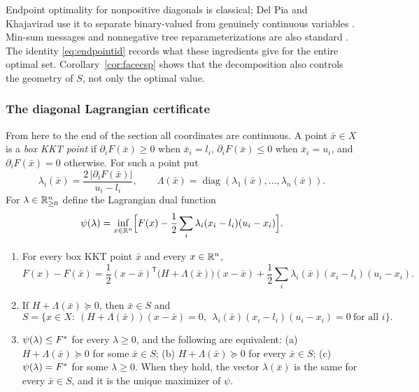 Endpoint optimality for nonpositive diagonals is classical; Del Pia and
Khajavirad use it to separate binary-valued from genuinely continuous
variables \cite{DelPiaKhajavirad2026}. Min-sum messages and nonnegative tree
reparameterizations are also standard \cite{Dechter1999,WainwrightJaakkolaWillsky2005}.
The identity \eqref{eq:endpointid} records what these ingredients give for
the entire optimal set. Corollary~\ref{cor:facecsp} shows that the
decomposition also controls the geometry of $S$, not only the optimal value.

\subsubsection{The diagonal Lagrangian certificate}

From here to the end of the section all coordinates are continuous. A point
$\bar x\in X$ is a \emph{box KKT point} if $\partial_iF(\bar x)\ge0$ when
$\bar x_i=l_i$, $\partial_iF(\bar x)\le0$ when $\bar x_i=u_i$, and
$\partial_iF(\bar x)=0$ otherwise. For such a point put
\[
\lambda_i(\bar x)=\frac{2\,|\partial_iF(\bar x)|}{u_i-l_i},\qquad
\Lambda(\bar x)=\operatorname{diag}(\lambda_1(\bar x),\ldots,\lambda_n(\bar x)).
\]
For $\lambda\in\mathbb R^n_{\ge0}$ define the Lagrangian dual function
\[
\psi(\lambda)=\inf_{x\in\mathbb R^n}\Bigl[F(x)-\frac12\sum_i\lambda_i(x_i-l_i)(u_i-x_i)\Bigr].
\]

\begin{lemma}\label{lem:diagcert}
\begin{enumerate}
\item[(i)] For every box KKT point $\bar x$ and every $x\in\mathbb R^n$,
\begin{equation}\label{eq:diagid}
F(x)-F(\bar x)=\frac12(x-\bar x)^{\mathsf T}\bigl(H+\Lambda(\bar x)\bigr)(x-\bar x)
+\frac12\sum_i\lambda_i(\bar x)(x_i-l_i)(u_i-x_i).
\end{equation}
\item[(ii)] If $H+\Lambda(\bar x)\succeq0$, then $\bar x\in S$ and
\begin{equation}\label{eq:diagset}
S=\bigl\{x\in X:\ (H+\Lambda(\bar x))(x-\bar x)=0,\ \
\lambda_i(\bar x)(x_i-l_i)(u_i-x_i)=0\ \text{for all }i\bigr\}.
\end{equation}
\item[(iii)] $\psi(\lambda)\le F^*$ for every $\lambda\ge0$, and the
following are equivalent: (a) $H+\Lambda(\bar x)\succeq0$ for some
$\bar x\in S$; (b) $H+\Lambda(\bar x)\succeq0$ for every $\bar x\in S$;
(c) $\psi(\lambda)=F^*$ for some $\lambda\ge0$. When they hold, the vector
$\lambda(\bar x)$ is the same for every $\bar x\in S$, and it is the unique
maximizer of $\psi$.
\end{enumerate}
\end{lemma}

